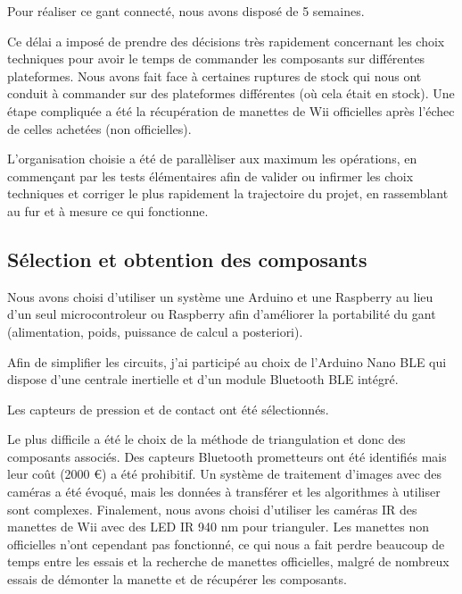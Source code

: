 \documentclass{article}
\begin{document}
            Pour réaliser ce gant connecté, nous avons disposé de 5 semaines.

            Ce délai a imposé de prendre des décisions très rapidement concernant les choix techniques
                pour avoir le temps de commander les composants sur différentes plateformes.
            Nous avons fait face à certaines ruptures de stock qui nous ont conduit à commander sur 
                des plateformes différentes (où cela était en stock).
            Une étape compliquée a été la récupération de manettes de Wii officielles après l'échec
                de celles achetées (non officielles).

            L'organisation choisie a été de parallèliser aux maximum les opérations, en commençant par les tests élémentaires
                afin de valider ou infirmer les choix techniques et corriger le plus rapidement la trajectoire du projet,
                en rassemblant au fur et à mesure ce qui fonctionne.

        \subsection{Sélection et obtention des composants}
        
            Nous avons choisi d'utiliser un système une Arduino et une Raspberry
                au lieu d'un seul microcontroleur ou Raspberry afin d'améliorer la portabilité du gant
                (alimentation, poids, puissance de calcul a posteriori).           
            

            Afin de simplifier les circuits, j'ai participé au choix de l'Arduino Nano BLE
                qui dispose d'une centrale inertielle et d'un module Bluetooth BLE intégré.

            Les capteurs de pression et de contact ont été sélectionnés.

            Le plus difficile a été le choix de la méthode de triangulation et donc des composants associés.
                Des capteurs Bluetooth prometteurs ont été identifiés mais leur coût (2000 €) a été prohibitif.
                Un système de traitement d'images avec des caméras a été évoqué, mais les données à transférer
                et les algorithmes à utiliser sont complexes.
                Finalement, nous avons choisi d'utiliser les caméras IR des manettes de Wii avec des LED IR 940 nm
            pour trianguler. Les manettes non officielles n'ont cependant pas fonctionné, ce qui nous a fait
            perdre beaucoup de temps entre les essais et la recherche de manettes officielles, malgré de nombreux essais
                de démonter la manette et de récupérer les composants.        
\end{document}

